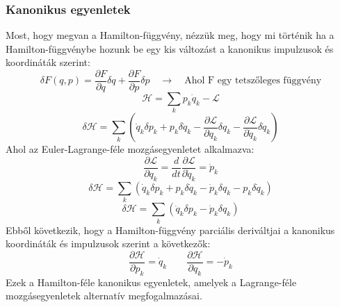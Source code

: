 \documentclass[a4paper,12pt]{article}
\begin{document}
\subsubsection{Kanonikus egyenletek}
Most, hogy megvan a Hamilton-függvény, nézzük meg, hogy mi történik ha a Hamilton-függvénybe hozunk be egy kis változást a kanonikus impulzusok és koordináták szerint:
\begin{equation}
    \delta F(q, p) = \frac{\partial F}{\partial q} \delta q + \frac{\partial F}{\partial p} \delta p \quad \rightarrow \quad \text{Ahol F egy tetszőleges függvény}
\end{equation}
\begin{equation}
    \mathcal{H} = \sum_k p_k \dot{q}_k - \mathcal{L}
\end{equation}
\begin{equation}
    \delta \mathcal{H} = \sum_k \left( \dot{q}_k \delta p_k + p_k \delta \dot{q}_k - \frac{\partial \mathcal{L}}{\partial q_k} \delta q_k - \frac{\partial \mathcal{L}}{\partial \dot{q}_k} \delta \dot{q}_k \right)
\end{equation}
Ahol az Euler-Lagrange-féle mozgásegyenletet alkalmazva:
\begin{equation}
    \frac{\partial \mathcal{L}}{\partial q_k} = \frac{d}{dt} \frac{\partial \mathcal{L}}{\partial \dot{q}_k} = \dot{p}_k
\end{equation}
\begin{equation}
    \delta \mathcal{H} = \sum_k \left( \dot{q}_k \delta p_k + p_k \delta \dot{q}_k - \dot{p}_k \delta q_k - p_k \delta \dot{q}_k \right)
\end{equation}
\begin{equation}
    \delta \mathcal{H} = \sum_k \left( \dot{q}_k \delta p_k - \dot{p}_k \delta q_k \right)
\end{equation}
Ebből következik, hogy a Hamilton-függvény parciális deriváltjai a kanonikus koordináták és impulzusok szerint a következők:
\begin{equation}
    \frac{\partial \mathcal{H}}{\partial p_k} = \dot{q}_k \quad \quad \frac{\partial \mathcal{H}}{\partial q_k} = -\dot{p}_k
\end{equation}
Ezek a Hamilton-féle kanonikus egyenletek, amelyek a Lagrange-féle mozgásegyenletek alternatív megfogalmazásai.
\end{document}
